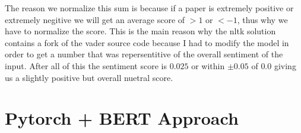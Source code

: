 \documentclass[12pt]{article}
\begin{document}
The reason we normalize this sum is because if a paper is extremely positive 
or extremely negitive we will get an average score of $>1$ or $<-1$, thus why we
have to normalize the score. This is the main reason why the nltk solution
contains a fork of the vader source code because I had to modify the model in order
to get a number that was repersentitive of the overall sentiment of the input.
After all of this the sentiment score is $0.025$ or within $\pm0.05$ of $0.0$ giving
us a slightly positive but overall nuetral score.

\newpage
\section{Pytorch + BERT Approach}

\newpage
{}

\end{document}

